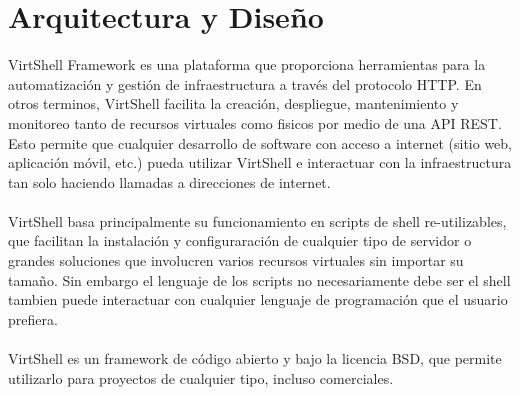 \chapter{Arquitectura y Diseño}
\label{Arquitectura}

VirtShell Framework es una plataforma que proporciona herramientas para la automatización y gestión de infraestructura a través del protocolo HTTP. En otros terminos, VirtShell facilita la creación, despliegue, mantenimiento y monitoreo tanto de recursos virtuales como fisicos por medio de una API REST. Esto permite que cualquier desarrollo de software con acceso a internet (sitio web, aplicación móvil, etc.) pueda utilizar VirtShell e interactuar con la infraestructura tan solo haciendo llamadas a direcciones de internet. \\
\\
VirtShell basa principalmente su funcionamiento en scripts de shell re-utilizables, que facilitan la instalación y configuraración de cualquier tipo de servidor o grandes soluciones que involucren varios recursos virtuales sin importar su tamaño. Sin embargo el lenguaje de los scripts no necesariamente debe ser el shell tambien puede interactuar con cualquier lenguaje de programación que el usuario prefiera.\\
\\
VirtShell es un framework de código abierto y bajo la licencia BSD, que permite utilizarlo para proyectos de cualquier tipo, incluso comerciales. 





